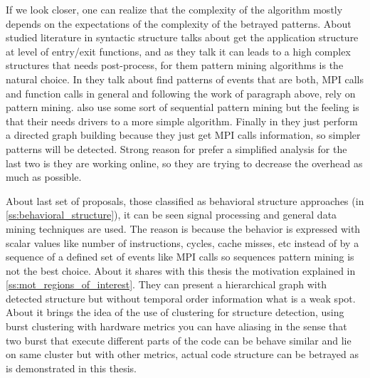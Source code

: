 If we look closer, one can realize that the complexity of the algorithm mostly 
depends on the expectations of the complexity of the betrayed patterns. 
About studied literature in syntactic 
structure \cite{Safyallah2006} \cite{Zhao2008} talks about get the 
application structure at level of entry/exit functions, and as they talk it can 
leads to a high complex structures that needs post-process, for them 
pattern mining algorithms is the natural choice. In \cite{trahay2015selecting}
they talk about find patterns of events that are both, MPI calls and function
calls in general and following the work of paragraph above, rely on pattern mining. 
\cite{noeth2009scalatrace} also use some sort of sequential pattern mining but 
the feeling is that their needs drivers to a more simple algorithm. Finally in
\cite{aguilar2016event} they just perform a directed graph building because they
just get MPI calls information, so simpler patterns will be detected. Strong
reason for prefer a simplified analysis for the last two is they are working 
online, so they are trying to decrease the overhead as much as possible.

About last set of proposals, those classified as behavioral
structure approaches (in \ref{ss:behavioral_structure}), it can be seen signal
processing and general data mining techniques are used. The reason is
because the behavior is expressed with scalar values like number of
instructions, cycles, cache misses, etc instead of by a sequence of a 
defined set of events like MPI calls so sequences pattern mining is not the best
choice. About \cite{casas2007automatic} it shares with this thesis the motivation 
explained in \ref{ss:mot_regions_of_interest}. They can present a
hierarchical graph with detected structure but without temporal order
information what is a weak spot. About \cite{gonzalez2013application} it brings 
the idea of the use
of clustering for structure detection, using burst clustering with hardware 
metrics you can have aliasing in the sense that two burst that execute different
parts of the code can be behave similar and lie on same cluster but with other
metrics, actual code structure can be betrayed as is demonstrated in this
thesis.

